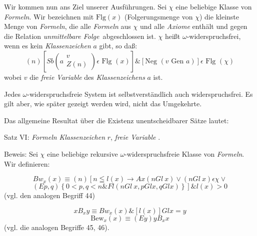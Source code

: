 \documentclass[draft]{scrartcl}
\begin{document}
Wir kommen nun ans Ziel unserer Ausführungen. Sei $\chi$ eine beliebige Klasse von 
\textit{Formeln}. Wir bezeichnen mit $\text{Flg}\left(x\right)$ (Folgerungsmenge von 
$\chi$) die kleinste Menge von \textit{Formeln}, die alle \textit{Formeln} aus $\chi$ 
und alle \textit{Axiome} enthält und gegen die Relation 
\glqq\textit{unmittelbare Folge}\grqq\ abgeschlossen ist. $\chi$ heißt 
$\omega$-widerspruchsfrei, wenn es kein \textit{Klassenzeichen} $a$ gibt, so daß:
\begin{equation*}
	\left(n\right)\left[Sb\left(a\substack{v\\ Z\left(n\right)}\right) \epsilon \text{ Flg } \left(x\right)\right] \& \left[\text{Neg }\left(v\text{ Gen } a\right)\right] \epsilon \text{ Flg }\left(\chi\right)
\end{equation*}
wobei $v$ die \textit{freie Variable} des \textit{Klassenzeichens} $a$ ist.

Jedes $\omega$-widerspruchsfreie System ist selbstverständlich auch widerspruchsfrei. Es gilt aber, wie später gezeigt werden wird, nicht das Umgekehrte.

Das allgemeine Resultat über die Existenz unentscheidbarer Sätze lautet:

Satz VI:  \textit{Formeln}  \textit{Klassenzeichen} $r$,  \textit{freie Variable} .

Beweis: Sei $\chi$ eine beliebige rekursive $\omega$-widerspruchsfreie Klasse von \textit{Formeln}. Wir definieren:

\begin{equation}
	Bw_x\left(x\right) \equiv \left(n\right) \left[ n \leqq l\left(x\right) \longrightarrow Ax\left(n Gl\ x\right) \lor \left(n Gl\ x\right) \epsilon \chi \lor\right.
\end{equation}
\begin{equation*}
	\left.\left(Ep, q\right) \left\{0 < p, q < n \& Fl\left(n Gl\ x, p Gl x, q Gl x\right)\right\}\right] \& l\left(x\right) > 0
\end{equation*}
(vgl. den analogen Begriff 44)

\begin{equation}
	x B_x y \equiv Bw_x\left(x\right) \& \left[l\left(x\right)\right] Gl x = y
\end{equation}
\begin{equation}
	\tag{6.1}
	\text{Bew}_x\left(x\right) \equiv \left(Ey\right) y B_x x
\end{equation}
(vgl. die analogen Begriffe 45, 46).
\end{document}
